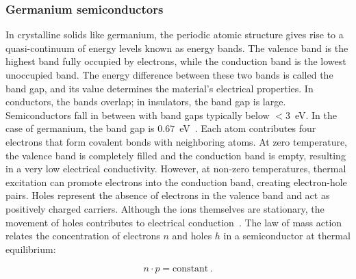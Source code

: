 \subsubsection{Germanium semiconductors}
In crystalline solids like germanium, the periodic atomic structure gives rise to a quasi-continuum of energy levels known as energy bands. The valence band is the highest band fully occupied by electrons, while the conduction band is the lowest unoccupied band. The energy difference between these two bands is called the band gap, and its value determines the material's electrical properties. In conductors, the bands overlap; in insulators, the band gap is large. Semiconductors fall in between with band gaps typically below $<3$~eV.  
In the case of germanium, the band gap is $0.67$~eV~\cite{hofmann_solid_2015}. Each atom contributes four electrons that form covalent bonds with neighboring atoms. At zero temperature, the valence band is completely filled and the conduction band is empty, resulting in a very low electrical conductivity. 
However, at non-zero temperatures, thermal excitation can promote electrons into the conduction band, creating electron-hole pairs. Holes represent the absence of electrons in the valence band and act as positively charged carriers. Although the ions themselves are stationary, the movement of holes contributes to electrical conduction~\cite{hofmann_solid_2015, simon_oxford_2017}. 
The law of mass action relates the concentration of electrons $n$ and holes $h$ in a semiconductor at thermal equilibrium: 

\begin{equation}
\label{eq:law_of_mass_action}
	n \cdot p = \text{constant} \,.
\end{equation}

